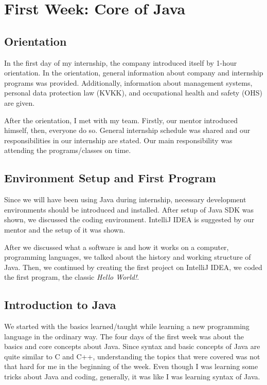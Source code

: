 \section{First Week: Core of Java}

\subsection{Orientation}

In the first day of my internship, the company introduced itself by 1-hour orientation. In the orientation, general information about company and internship programs was provided. Additionally, information about management systems, personal data protection law (KVKK), and occupational health and safety (OHS) are given.

After the orientation, I met with my team. Firstly, our mentor introduced himself, then, everyone do so. General internship schedule was shared and our responsibilities in our internship are stated. Our main responsibility was attending the programs/classes on time.

\subsection{Environment Setup and First Program}

Since we will have been using Java during internship, necessary development environments should be introduced and installed. After setup of Java SDK was shown, we discussed the coding environment. IntelliJ IDEA is suggested by our mentor and the setup of it was shown. 

After we discussed what a software is and how it works on a computer, programming languages, we talked about the history and working structure of Java. Then, we continued by creating the first project on IntelliJ IDEA, we coded the first program, the classic \textit{Hello World!}.

\subsection{Introduction to Java}

We started with the basics learned/taught while learning a new programming language in the ordinary way. The four days of the first week was about the basics and core concepts about Java. Since syntax and basic concepts of Java are quite similar to C and C++, understanding the topics that were covered was not that hard for me in the beginning of the week. Even though I was learning some tricks about Java and coding, generally, it was like I was learning syntax of Java.

